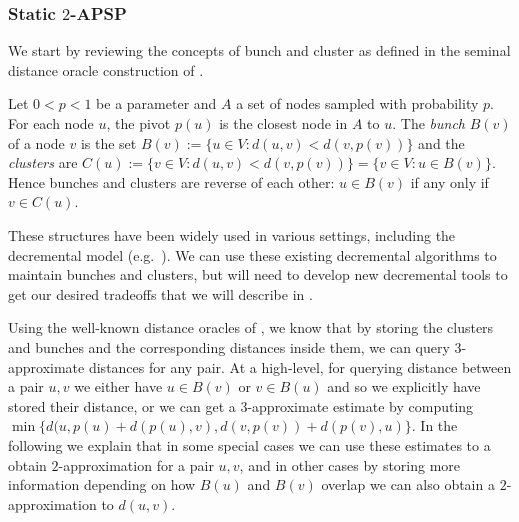 \documentclass[11pt]{article}
\theoremstyle{definition}
\theoremstyle{remark}
\begin{document}
\begin{titlepage}
\subsubsection{Static \texorpdfstring{$2$}{2}-APSP} 
We start by reviewing the concepts of bunch and cluster as defined in the seminal distance oracle construction of \cite{TZ2005}.

Let $0<p <1$ be a parameter and $A$ a set of nodes sampled with probability $p$. For each node $u$, the pivot $p(u)$ is the closest node in $A$ to $u$. The \textit{bunch} $B(v)$ of a node $v$ is the set $B(v):=\{ u \in V : d(u,v) < d(v,p(v)) \}$ and the \textit{clusters} are $C(u):= \{ v \in V: d(u,v) < d(v,p(v)) \}=\{v \in V: u\in B(v)\}$. Hence bunches and clusters are reverse of each other: $u \in B(v)$ if any only if $v \in C(u)$.

 These structures have been widely used in various settings, including the decremental model (e.g.~\cite{HKN2016, RodittyZ11, LN2020, Chechik18}). We can use these existing decremental algorithms to maintain bunches and clusters, but will need to develop new decremental tools to get our desired tradeoffs that we will describe in .

Using the well-known distance oracles of \cite{TZ2005}, we know that by storing the clusters and bunches and the corresponding distances inside them, we can query $3$-approximate distances for any pair. At a high-level, for querying distance between a pair $u, v$ we either have $u \in B(v)$ or $v \in B(u)$ and so we explicitly have stored their distance, or we can get a $3$-approximate estimate by computing $\min \{d(u,p(u)+d(p(u),v), d(v, p(v))+d(p(v), u)\}$. In the following we explain that in some special cases we can use these estimates to a obtain $2$-approximation for a pair $u,v$, and in other cases by storing more information depending on how $B(u)$ and $B(v)$ overlap we can also obtain a $2$-approximation to $d(u,v)$. 


\end{titlepage}
\end{document}
